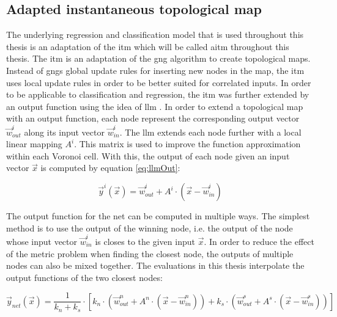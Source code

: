 \subsection{Adapted instantaneous topological map \label{sec:ITM}}
The underlying regression and classification model that is used throughout this thesis is an adaptation of the \acrfull{itm} which will be called \acrfull{aitm} throughout this thesis.
The \gls{itm} \cite{itm} is an adaptation of the \gls{gng} \cite{gng} algorithm to create topological maps. Instead of \glspl{gng} global update rules for inserting new nodes in the map, the \gls{itm} uses local update rules in order to be better suited for correlated inputs. 
In order to be applicable to classification and regression, the \gls{itm} was further extended by an output function using the idea of \gls{llm} \cite{LLM}. In order to extend a topological map with an output function, each node represent the corresponding output vector $\vec{w}^i_{out}$ along its input vector $\vec{w}^i_{in}$. The \gls{llm} extends each node further with a local linear mapping $A^i$. This matrix is used to improve the function approximation within each Voronoi cell. With this, the output of each node given an input vector $\vec{x}$ is computed by equation \ref{eq:llmOut}:

\begin{equation}
\vec{y}^i(\vec{x}) = \vec{w}^i_{out} + A^i \cdot (\vec{x}-\vec{w}^i_{in})
\label{eq:llmOut}
\end{equation}

The output function for the net can be computed in multiple ways. The simplest method is to use the output of the winning node, i.e. the output of the node whose input vector $\vec{w}^i_{in}$ is closes to the given input $\vec{x}$. In order to reduce the effect of the metric problem when finding the closest node, the outputs of multiple nodes can also be mixed together. The evaluations in this thesis interpolate the output functions of the two closest nodes:

\begin{equation}
\vec{y}_{net}(\vec{x}) =  \frac{1}{k_n+k_s} \cdot \left[ k_n \cdot \left(\vec{w}^n_{out} + A^n \cdot \left(\vec{x}-\vec{w}^n_{in}\right)\right) + k_s \cdot  \left(\vec{w}^s_{out} + A^s \cdot \left(\vec{x}-\vec{w}^s_{in}\right)\right)\right]
\end{equation}

